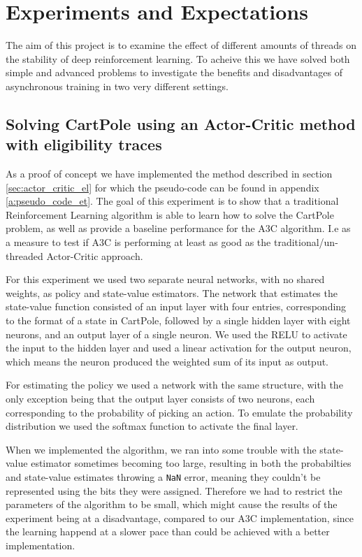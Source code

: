 \documentclass[11pt]{article}
\begin{document}

\section{Experiments and Expectations}

The aim of this project is to examine the effect of different amounts of threads
on the stability of deep reinforcement learning.
To acheive this we have solved both simple and advanced problems to investigate
the benefits and disadvantages of asynchronous training in two very different
settings.

\subsection{Solving CartPole using an Actor-Critic method with eligibility traces}

As a proof of concept we have implemented the method described in section
\ref{sec:actor_critic_el} for which the pseudo-code
can be found in appendix \ref{a:pseudo_code_et}.
The goal of this experiment is to show that a 
traditional Reinforcement Learning algorithm
is able to learn how to solve the CartPole problem, as well as provide a
baseline performance for the A3C algorithm.
I.e as a measure to test if A3C is performing at least as good
as the traditional/un-threaded Actor-Critic approach.

For this experiment we used two separate neural networks, with no
shared weights, as policy and state-value estimators.
The network that estimates the state-value function consisted of an
input layer with four entries, corresponding to the format of a state in CartPole,
followed by a single hidden layer with eight neurons, and an output layer of a single
neuron.
We used the RELU to activate the input to the
hidden layer and used a linear activation for the output neuron,
which means the neuron produced the weighted sum of its input as output.

For estimating the policy we used a network with the same structure,
with the only exception being that the output layer consists of two
neurons, each corresponding to the probability of picking an action.
To emulate the probability distribution we used the softmax function
to activate the final layer.

When we implemented the algorithm, we ran into some trouble with
the state-value estimator sometimes becoming too large, resulting
in both the probabilties and state-value estimates throwing a \texttt{NaN} error,
meaning they couldn't be represented using the bits they were assigned.
Therefore we had to restrict the parameters of the algorithm to
be small, which might cause the results of the
experiment being at a disadvantage, compared to our A3C implementation, since the learning happend
at a slower pace than could be achieved with a better implementation.
\end{document}
